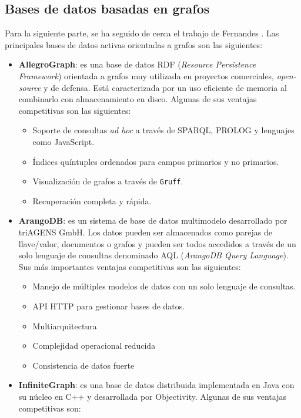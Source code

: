 \documentclass[11pt,letterpaper,oneside]{article}
\begin{document}
	\subsection{Bases de datos basadas en grafos}
	Para la siguiente parte, se ha seguido de cerca el trabajo de Fernandes \cite{Fernandes-2018}. Las principales bases de datos activas orientadas a grafos son las siguientes:
	\begin{itemize}
		\item \textbf{AllegroGraph}: es una base de datos RDF ({\em Resource Persistence Framework}) orientada a grafos muy utilizada en proyectos comerciales, {\em open-source} y de defensa. Está caracterizada por un uso eficiente de memoria al combinarlo con almacenamiento en disco. Algunas de sus ventajas competitivas son las siguientes:
		\begin{itemize}
			\item Soporte de consultas {\em ad hoc} a través de SPARQL, PROLOG y lenguajes como JavaScript.
			\item Índices quíntuples ordenados para campos primarios y no primarios.
			\item Visualización de grafos a través de \texttt{Gruff}.
			\item Recuperación completa y rápida.
		\end{itemize}
		\item \textbf{ArangoDB}: es un sistema de base de datos multimodelo desarrollado por triAGENS GmbH. Los datos pueden ser almacenados como parejas de llave/valor, documentos o grafos y pueden ser todos accedidos a través de un solo lenguaje de consultas denominado AQL ({\em ArangoDB Query Language}). Sus más importantes ventajas competitivas son las siguientes:
		\begin{itemize}
			\item Manejo de múltiples modelos de datos con un solo lenguaje de consultas.
			\item API HTTP para gestionar bases de datos.
			\item Multiarquitectura
			\item Complejidad operacional reducida
			\item Consistencia de datos fuerte
		\end{itemize}
		\item \textbf{InfiniteGraph}: es una base de datos distribuida implementada en Java con su núcleo en C++ y desarrollada por Objectivity. Algunas de sus ventajas competitivas son:
		\begin{itemize}

\end{itemize}
\end{itemize}
\end{document}

